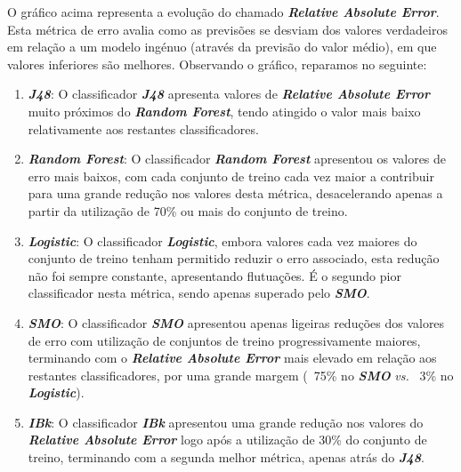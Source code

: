 \documentclass{easychair}
\begin{document}
O gráfico acima representa a evolução do chamado \textit{\textbf{Relative Absolute Error}}. Esta métrica de erro avalia como as previsões se desviam dos valores verdadeiros em relação a um modelo ingénuo (através da previsão do valor médio), em que valores inferiores são melhores. Observando o gráfico, reparamos no seguinte:

\begin{enumerate}
	\item \textbf{\textit{J48}}: O classificador \textit{\textbf{J48}} apresenta valores de \textit{\textbf{Relative Absolute Error}} muito próximos do \textit{\textbf{Random Forest}}, tendo atingido o valor mais baixo relativamente aos restantes classificadores.
	\item \textbf{\textit{Random Forest}}: O classificador \textit{\textbf{Random Forest}} apresentou os valores de erro mais baixos, com cada conjunto de treino cada vez maior a contribuir para uma grande redução nos valores desta métrica, desacelerando apenas a partir da utilização de 70\% ou mais do conjunto de treino.
	\item \textbf{\textit{Logistic}}: O classificador \textit{\textbf{Logistic}}, embora valores cada vez maiores do conjunto de treino tenham permitido reduzir o erro associado, esta redução não foi sempre constante, apresentando flutuações. É o segundo pior classificador nesta métrica, sendo apenas superado pelo \textit{\textbf{SMO}}.
	\item \textbf{\textit{SMO}}: O classificador \textbf{\textit{SMO}} apresentou apenas ligeiras reduções dos valores de erro com utilização de conjuntos de treino progressivamente maiores, terminando com o \textit{\textbf{Relative Absolute Error}} mais elevado em relação aos restantes classificadores, por uma grande margem (~75\% no \textbf{\textit{SMO}} \textit{vs.} ~3\% no  \textbf{\textit{Logistic}}).
	\item \textbf{\textit{IBk}}: O classificador \textit{\textbf{IBk}} apresentou uma grande redução nos valores do  \textit{\textbf{Relative Absolute Error}} logo após a utilização de 30\% do conjunto de treino, terminando com a segunda melhor métrica, apenas atrás do \textbf{\textit{J48}}.
\end{enumerate}
\end{document}

